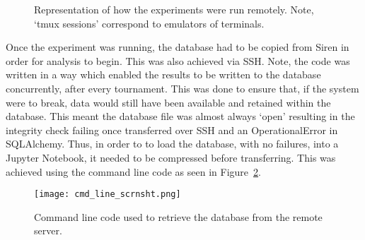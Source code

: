 \begin{figure}
    \centering
    
    \caption{Representation of how the experiments were run remotely. Note, `tmux sessions' correspond to emulators of terminals.}\label{fig:remote_comp}
\end{figure}

Once the experiment was running, the database had to be copied from
Siren in order for analysis to begin. This was also achieved via SSH\@. Note, the code was written in a way
which enabled the results to be written to the database concurrently, after
every tournament. This was done to ensure that, if the system were to break, data
would still have been available and retained within the database. This meant
the database file was almost always `open' resulting in the integrity check
failing once transferred over SSH and an OperationalError in SQLAlchemy. Thus, in
order to to load the database, with no failures, into a Jupyter Notebook, it
needed to be compressed before transferring. This was achieved using the command
line code as seen in Figure~\ref{fig:cmd_code_db}.

\begin{figure}
    \centering
    \texttt{[image: cmd\_line\_scrnsht.png]}
    \caption{Command line code used to retrieve the database from the remote server.}\label{fig:cmd_code_db}
\end{figure}

